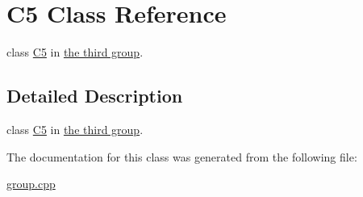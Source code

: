 \hypertarget{class_c5}{\section{C5 Class Reference}
\label{class_c5}
}


class \hyperlink{class_c5}{C5} in \hyperlink{group__group3}{the third group}.  




\subsection{Detailed Description}
class \hyperlink{class_c5}{C5} in \hyperlink{group__group3}{the third group}. 

The documentation for this class was generated from the following file\-:\begin{DoxyCompactItemize}
\item 
\hyperlink{group_8cpp}{group.\-cpp}\end{DoxyCompactItemize}
